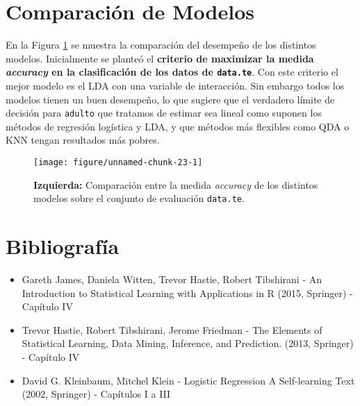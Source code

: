 \documentclass[a4paper]{article}\usepackage[]{graphicx}\usepackage[]{color}
\makeatletter
\def\maxwidth{ %
  \ifdim\Gin@nat@width>\linewidth
    \linewidth
  \else
    \Gin@nat@width
  \fi
}
\newenvironment{knitrout}{}{} %
\makeatother
\begin{document}
\clearpage
\section{Comparación de Modelos}

En la Figura \ref{fig:comp} se muestra la comparación del desempeño de los distintos modelos. Inicialmente se planteó el \textbf{criterio de maximizar la medida \textit{accuracy} en la clasificación de los datos de \texttt{\textcolor{BurntOrange}{data.te}}}. Con este criterio el mejor modelo es el LDA con una variable de interacción. Sin embargo todos los modelos tienen un buen desempeño, lo que sugiere que el verdadero límite de decisión para \texttt{\textcolor{BurntOrange}{adulto}} que tratamos de estimar sea lineal como suponen los métodos de regresión logística y LDA, y que métodos más flexibles como QDA o KNN tengan resultados más pobres.


\begin{figure}[t]

\begin{knitrout}
\color{fgcolor}

{\centering \texttt{[image: figure/unnamed-chunk-23-1]} 

}



\end{knitrout}
\caption{\textbf{Izquierda:} Comparación entre la medida \textit{accuracy} de los distintos modelos sobre el conjunto de evaluación \texttt{\textcolor{BurntOrange}{data.te}}.}
\label{fig:comp}
\end{figure}


\section{Bibliografía}

\begin{itemize}
	\item Gareth James, Daniela Witten, Trevor Hastie, Robert Tibshirani - An Introduction to Statistical Learning  with Applications in R (2015, Springer) - Capítulo IV
	\item Trevor Hastie,  Robert Tibshirani, Jerome Friedman - The Elements of  Statistical Learning, Data Mining, Inference, and Prediction. (2013, Springer) - Capítulo IV
	\item David G. Kleinbaum, Mitchel Klein - Logistic Regression A Self-learning Text (2002, Springer) - Capítulos I a III
	\end{itemize}
\end{document}
